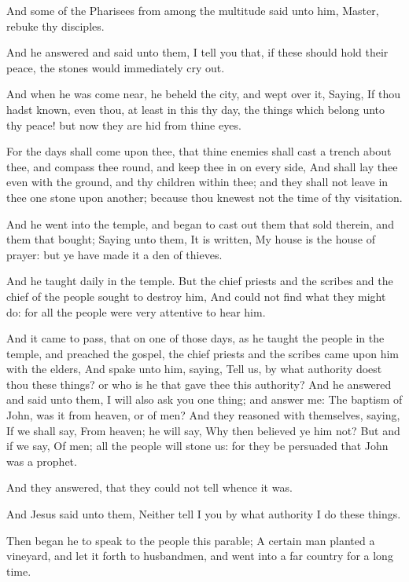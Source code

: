 \Verse And some of the Pharisees from among the multitude said unto him, Master, rebuke thy disciples.

\Verse And he answered and said unto them, I tell you that, if these should hold their peace, the stones would immediately cry out.

\Verse And when he was come near, he beheld the city, and wept over it, \Verse Saying, If thou hadst known, even thou, at least in this thy day, the things which belong unto thy peace! but now they are hid from thine eyes.

\Verse For the days shall come upon thee, that thine enemies shall cast a trench about thee, and compass thee round, and keep thee in on every side, \Verse And shall lay thee even with the ground, and thy children within thee; and they shall not leave in thee one stone upon another; because thou knewest not the time of thy visitation.

\Verse And he went into the temple, and began to cast out them that sold therein, and them that bought; \Verse Saying unto them, It is written, My house is the house of prayer: but ye have made it a den of thieves.

\Verse And he taught daily in the temple. But the chief priests and the scribes and the chief of the people sought to destroy him, \Verse And could not find what they might do: for all the people were very attentive to hear him.


\Chapter
\Verse And it came to pass, that on one of those days, as he taught the people in the temple, and preached the gospel, the chief priests and the scribes came upon him with the elders, \Verse And spake unto him, saying, Tell us, by what authority doest thou these things? or who is he that gave thee this authority?  \Verse And he answered and said unto them, I will also ask you one thing; and answer me: \Verse The baptism of John, was it from heaven, or of men?  \Verse And they reasoned with themselves, saying, If we shall say, From heaven; he will say, Why then believed ye him not?  \Verse But and if we say, Of men; all the people will stone us: for they be persuaded that John was a prophet.

\Verse And they answered, that they could not tell whence it was.

\Verse And Jesus said unto them, Neither tell I you by what authority I do these things.

\Verse Then began he to speak to the people this parable; A certain man planted a vineyard, and let it forth to husbandmen, and went into a far country for a long time.

